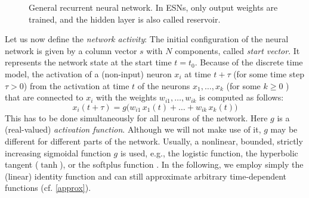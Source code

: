 \documentclass[twoside,11pt]{article}
\theoremstyle{definition}
\begin{document}
\begin{figure}
  \centering
  
  \caption{General recurrent neural network. In ESNs, only output weights are
	trained, and the hidden layer is also called reservoir.}
  \label{net}
\end{figure}

Let us now define the \emph{network activity}: The initial
configuration of the neural network is given by a column vector $s$ with $N$
components, called \emph{start vector}. It represents the network state at the
start time $t=t_0$. Because of the discrete time model, the activation
of a (non-input) neuron $x_i$ at time $t+\tau$ (for some time step $\tau>0$) from
the activation at time $t$ of the neurons $x_1,\dots,x_k$ (for some $k \ge 0$ ) that
are connected to $x_i$ with the weights $w_{i1},\dots,w_{ik}$ is computed as
follows:
\begin{equation}\label{recur}
	x_i(t+\tau) = g\big(w_{i1}\,x_1(t) +\dots+ w_{ik}\,x_k(t)\big)
\end{equation}
This has to be done simultaneously for all neurons of the network. Here $g$ is a
(real-valued) \emph{activation function}. Although we will not make use of it,
$g$ may be different for different parts of the network.
Usually, a nonlinear, bounded, strictly increasing sigmoidal function $g$ is
used, e.g., the logistic function, the hyperbolic tangent ($\tanh$), or the
softplus function \citep[Sect.~3.10]{GBC16}. In the following, we employ simply
the (linear) identity function and can still approximate arbitrary
time-dependent functions (cf. \cref{approx}).
\end{document}
